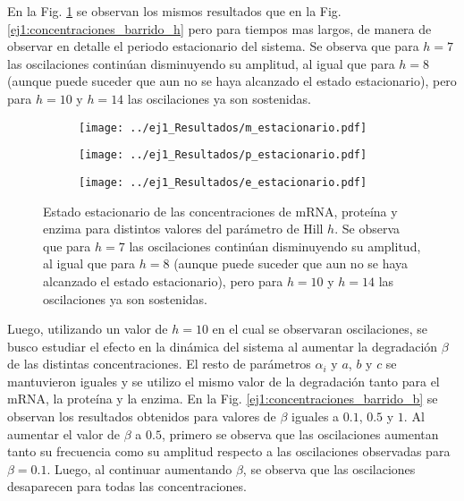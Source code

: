 En la Fig. \ref{ej1:concentraciones_barrido_h_estacionario} se observan los mismos resultados que en la Fig. \ref{ej1:concentraciones_barrido_h} pero para tiempos mas largos, de manera de observar en detalle el periodo estacionario del sistema. Se observa que para $h=7$ las oscilaciones continúan disminuyendo su amplitud, al igual que para $h=8$ (aunque puede suceder que aun no se haya alcanzado el estado estacionario), pero para $h=10$ y $h=14$ las oscilaciones ya son sostenidas.

\begin{figure}[htb!]
    \centering
    \begin{subfigure}[b]{0.42\textwidth}
        \texttt{[image: ../ej1\_Resultados/m\_estacionario.pdf]}
    \end{subfigure}
    \begin{subfigure}[b]{0.42\textwidth}
        \texttt{[image: ../ej1\_Resultados/p\_estacionario.pdf]}
    \end{subfigure}
    \begin{subfigure}[b]{0.42\textwidth}
        \texttt{[image: ../ej1\_Resultados/e\_estacionario.pdf]}
    \end{subfigure}
    \caption{Estado estacionario de las concentraciones de mRNA, proteína y enzima para distintos valores del parámetro de Hill $h$. Se observa que para $h=7$ las oscilaciones continúan disminuyendo su amplitud, al igual que para $h=8$ (aunque puede suceder que aun no se haya alcanzado el estado estacionario), pero para $h=10$ y $h=14$ las oscilaciones ya son sostenidas.}
    \label{ej1:concentraciones_barrido_h_estacionario}
\end{figure}

Luego, utilizando un valor de $h=10$ en el cual se observaran oscilaciones, se busco estudiar el efecto en la dinámica del sistema al aumentar la degradación $\beta$ de las distintas concentraciones. El resto de parámetros $\alpha_i$ y $a$, $b$ y $c$ se mantuvieron iguales y se utilizo el mismo valor de la degradación tanto para el mRNA, la proteína y la enzima. En la Fig. \ref{ej1:concentraciones_barrido_b} se observan los resultados obtenidos para valores de $\beta$ iguales a $0.1$, $0.5$ y $1$. Al aumentar el valor de $\beta$ a $0.5$, primero se observa que las oscilaciones aumentan tanto su frecuencia como su amplitud respecto a las oscilaciones observadas para $\beta=0.1$. Luego, al continuar aumentando $\beta$, se observa que las oscilaciones desaparecen para todas las concentraciones.

